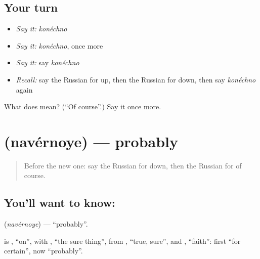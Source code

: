 \subsection*{Your turn}
\begin{itemize}
\raggedright
  \item \emph{Say it:} \emph{konéchno}
  \item \emph{Say it:} \emph{konéchno}, once more
  \item \emph{Say it:} say \emph{konéchno}
  \item \emph{Recall:} say the Russian for up, then the Russian for down, then say \emph{konéchno} again
\end{itemize}

\begin{tcolorbox}[breakable,colback=teal!4,colframe=teal!35!black,title={Before you move on}]
What does  mean? (\textquotedblleft{}Of course\textquotedblright{}.) Say it once more.
\end{tcolorbox}
\section[\texorpdfstring{\ru{наверное} (navérnoye)}{наверное (navérnoye)}]{ (navérnoye) — probably}

\label{lesson:RU-C215-navernoye}



\begin{quote}
Before the new one: say the Russian for down, then the Russian for of course.
\end{quote}

\subsection*{You'll want to know: }
\textbf{} (\emph{navérnoye}) — \textquotedblleft{}probably\textquotedblright{}.

\begin{cousinweb}
\textbf{} is \emph{}, \textquotedblleft{}on\textquotedblright{}, with \emph{}, \textquotedblleft{}the sure thing\textquotedblright{}, from \emph{}, \textquotedblleft{}true, sure\textquotedblright{}, and \emph{}, \textquotedblleft{}faith\textquotedblright{}: first \textquotedblleft{}for certain\textquotedblright{}, now \textquotedblleft{}probably\textquotedblright{}.
\end{cousinweb}

